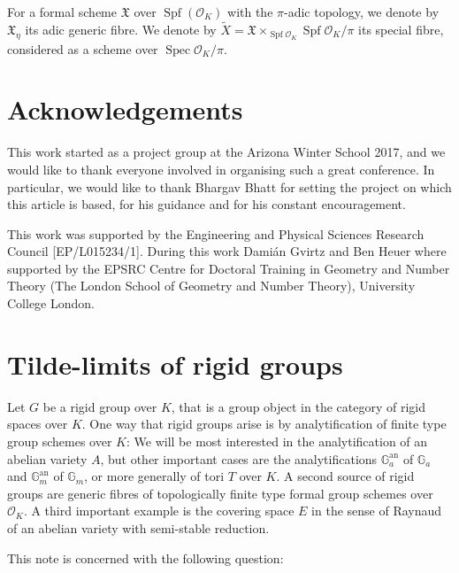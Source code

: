\documentclass[10pt,oneside]{amsart}
\theoremstyle{definition}
\theoremstyle{remark}
\begin{document}
	For a formal scheme $\mathfrak X$ over $\operatorname{Spf}(\mathcal O_K)$ with the $\pi$-adic topology, we denote by $\mathfrak X_\eta$ its adic generic fibre.
	We denote by
	$\tilde{X}=\mathfrak X\times_{\operatorname{Spf}\mathcal O_K}\operatorname{Spf}\mathcal O_K/\pi$ its special fibre, considered as a scheme over $\operatorname{Spec}\mathcal O_K/\pi$.

\section*{Acknowledgements}
This work started as a project group at the Arizona Winter School 2017, and we would like to thank everyone involved in organising such a great conference. In particular, we would like to thank Bhargav Bhatt for setting the project on which this article is based, for his guidance and for his constant encouragement. 

This work was supported by the Engineering and Physical Sciences Research Council [EP/L015234/1]. 
During this work Dami\'an Gvirtz and Ben Heuer where supported by the EPSRC Centre for Doctoral Training in Geometry and Number Theory (The London School of Geometry and Number Theory), University College London.

	\section{Tilde-limits of rigid groups}
	Let $G$ be a rigid group over $K$, that is a group object in the category of rigid spaces over $K$. One way that rigid groups arise is by analytification of finite type group schemes over $K$: We will be most interested in the analytification of an abelian variety $A$, but other important cases are the analytifications  $\mathbb G_a^{\operatorname{an}}$ of $\mathbb G_a$ and $\mathbb G_m^{\operatorname{an}}$ of $\mathbb G_m$, or more generally of tori $T$ over $K$. A second source of rigid groups are generic fibres of topologically finite type formal group schemes over $\mathcal O_K$. A third important example is the covering space $E$ in the sense of Raynaud of an abelian variety with semi-stable reduction.
	
	This note is concerned with the following question:
	
\end{document}
